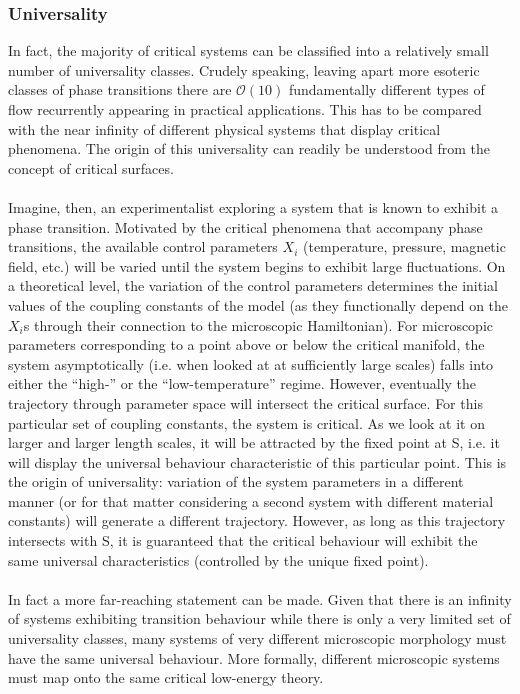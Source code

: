 \subsubsection{Universality}
In fact, the majority of critical systems can be classified into a relatively small number of universality classes. Crudely speaking, leaving apart more esoteric classes of phase transitions there are $\mathcal{O}(10)$ fundamentally different types of flow recurrently appearing in practical applications. This has to be compared with the near infinity of different physical systems that display critical phenomena. The origin of this universality can readily be understood from the concept of critical surfaces.
\\ \\
Imagine, then, an experimentalist exploring a system that is known to exhibit a phase transition. Motivated by the critical phenomena that accompany phase transitions, the available control parameters $X_i$ (temperature, pressure, magnetic field, etc.) will be varied until the system begins to exhibit large fluctuations. On a theoretical level, the variation of the control parameters determines the initial values of the coupling constants of the model (as they functionally depend on the $X_i$s through their connection to the microscopic Hamiltonian). For microscopic parameters corresponding to a point above or below the critical manifold, the system asymptotically (i.e. when looked at at sufficiently large scales) falls into either the ``high-'' or the ``low-temperature'' regime. 
However, eventually the trajectory through parameter space will intersect the critical surface. For this particular set of coupling constants, the system is critical. As we look at it on larger and larger length scales, it will be attracted by the fixed point at S, i.e. it will display the universal behaviour characteristic of this particular point. 
This is the origin of universality: variation of the system parameters in a different manner (or for that matter considering a second system with different material constants) will generate a different trajectory. 
However, as long as this trajectory intersects with S, it is guaranteed that the critical behaviour will exhibit the same universal characteristics (controlled by the unique fixed point).
\\ \\
In fact a more far-reaching statement can be made. Given that there is an infinity of systems exhibiting transition behaviour while there is only a very limited set of universality classes, many systems of very different microscopic morphology must have the same universal behaviour. More formally, different microscopic systems must map onto the same critical low-energy theory.

